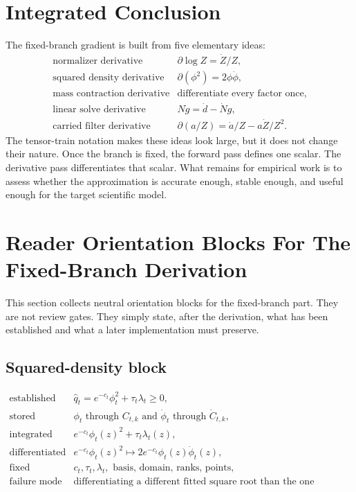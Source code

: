 \documentclass[11pt]{article}
\begin{document}
\section{Integrated Conclusion}

The fixed-branch gradient is built from five elementary ideas:
\[
\begin{array}{ll}
\text{normalizer derivative} & \partial\log Z=\dot Z/Z,\\[2mm]
\text{squared density derivative} & \partial(\phi^2)=2\phi\dot\phi,\\[2mm]
\text{mass contraction derivative} & \text{differentiate every factor once},\\[2mm]
\text{linear solve derivative} & N\dot g=\dot d-\dot N g,\\[2mm]
\text{carried filter derivative} & \partial(a/Z)=\dot a/Z-a\dot Z/Z^2.
\end{array}
\tag{P19-110}
\]
The tensor-train notation makes these ideas look large, but it does not change
their nature.  Once the branch is fixed, the forward pass defines one scalar.
The derivative pass differentiates that scalar.  What remains for empirical
work is to assess whether the approximation is accurate enough, stable enough,
and useful enough for the target scientific model.

\section{Reader Orientation Blocks For The Fixed-Branch Derivation}

This section collects neutral orientation blocks for the fixed-branch part.
They are not review gates.  They simply state, after the derivation, what has
been established and what a later implementation must preserve.

\subsection*{Squared-density block}

\[
\begin{array}{ll}
\text{established} &
    \widehat q_t=e^{-c_t}\phi_t^2+\tau_t\lambda_t\ge0,\\[1mm]
\text{stored} &
    \phi_t \text{ through } C_{t,k}
    \text{ and } \dot\phi_t \text{ through } \dot C_{t,k},\\[1mm]
\text{integrated} &
    e^{-c_t}\phi_t(z)^2+\tau_t\lambda_t(z),\\[1mm]
\text{differentiated} &
    e^{-c_t}\phi_t(z)^2
    \mapsto 2e^{-c_t}\phi_t(z)\dot\phi_t(z),\\[1mm]
\text{fixed} &
    c_t,\tau_t,\lambda_t,\text{ basis, domain, ranks, points},\\[1mm]
\text{failure mode} &
    \text{differentiating a different fitted square root than the one squared.}
\end{array}
\tag{P22-R1}
\]
\end{document}

